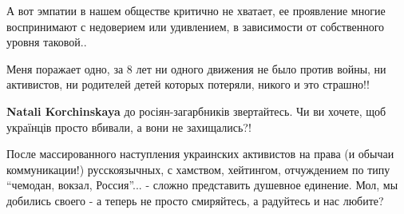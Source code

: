 \begin{itemize}
А вот эмпатии в нашем обществе критично не хватает, ее проявление многие
воспринимают с недоверием или удивлением, в зависимости от собственного уровня
таковой..



Меня поражает одно, за 8 лет ни одного движения не было против войны, ни
активистов, ни родителей детей которых потеряли, никого и это страшно!!

\begin{itemize} %
\textbf{Natali Korchinskaya} до росіян-загарбників звертайтесь. Чи ви хочете, щоб українців просто вбивали, а вони не захищались?!
\end{itemize} %


После массированного наступления украинских активистов на права (и обычаи
коммуникации!) русскоязычных, с хамством, хейтингом, отчуждением по типу
\enquote{чемодан, вокзал, Россия}... - сложно представить душевное единение. Мол, мы
добились своего - а теперь не просто смиряйтесь, а радуйтесь и нас любите?


\end{itemize} %
